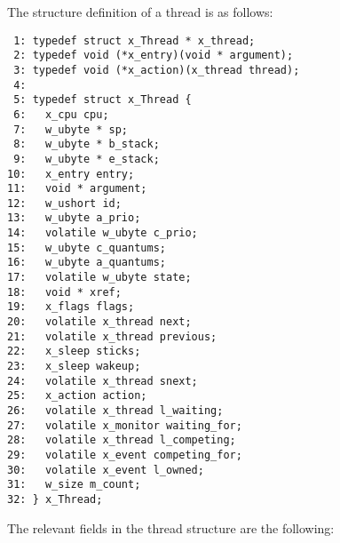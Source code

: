 The structure definition of a thread is as follows:

\bcode
\begin{verbatim}
 1: typedef struct x_Thread * x_thread;
 2: typedef void (*x_entry)(void * argument);
 3: typedef void (*x_action)(x_thread thread);
 4:
 5: typedef struct x_Thread {
 6:   x_cpu cpu;
 7:   w_ubyte * sp;
 8:   w_ubyte * b_stack;
 9:   w_ubyte * e_stack;
10:   x_entry entry;
11:   void * argument;
12:   w_ushort id;
13:   w_ubyte a_prio;
14:   volatile w_ubyte c_prio;
15:   w_ubyte c_quantums;
16:   w_ubyte a_quantums;
17:   volatile w_ubyte state;
18:   void * xref;
19:   x_flags flags;
20:   volatile x_thread next;
21:   volatile x_thread previous;
22:   x_sleep sticks;
23:   x_sleep wakeup;
24:   volatile x_thread snext;
25:   x_action action;
26:   volatile x_thread l_waiting;
27:   volatile x_monitor waiting_for;
28:   volatile x_thread l_competing;
29:   volatile x_event competing_for;
30:   volatile x_event l_owned;
31:   w_size m_count;
32: } x_Thread;
\end{verbatim}
\ecode

The relevant fields in the thread structure are the following:

